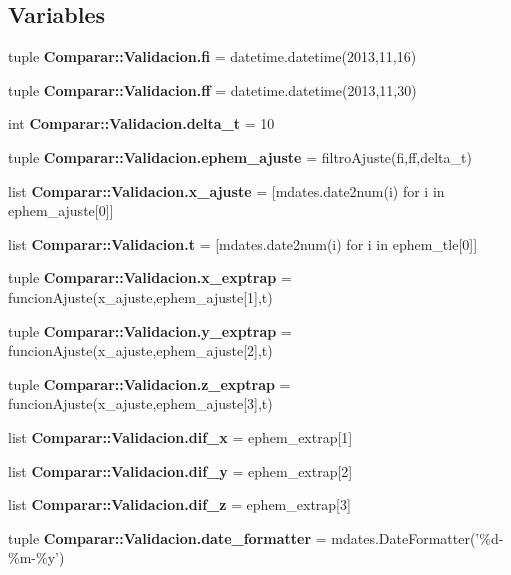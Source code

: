 \subsection*{\-Variables}
\begin{DoxyCompactItemize}
\item 
tuple {\bf \-Comparar\-::\-Validacion.\-fi} = datetime.\-datetime(2013,11,16)
\item 
tuple {\bf \-Comparar\-::\-Validacion.\-ff} = datetime.\-datetime(2013,11,30)
\item 
int {\bf \-Comparar\-::\-Validacion.\-delta\-\_\-t} = 10
\item 
tuple {\bf \-Comparar\-::\-Validacion.\-ephem\-\_\-ajuste} = filtro\-Ajuste(fi,ff,delta\-\_\-t)
\item 
list {\bf \-Comparar\-::\-Validacion.\-x\-\_\-ajuste} = [mdates.\-date2num(i) for i in ephem\-\_\-ajuste[0]]
\item 
list {\bf \-Comparar\-::\-Validacion.\-t} = [mdates.\-date2num(i) for i in ephem\-\_\-tle[0]]
\item 
tuple {\bf \-Comparar\-::\-Validacion.\-x\-\_\-exptrap} = funcion\-Ajuste(x\-\_\-ajuste,ephem\-\_\-ajuste[1],t)
\item 
tuple {\bf \-Comparar\-::\-Validacion.\-y\-\_\-exptrap} = funcion\-Ajuste(x\-\_\-ajuste,ephem\-\_\-ajuste[2],t)
\item 
tuple {\bf \-Comparar\-::\-Validacion.\-z\-\_\-exptrap} = funcion\-Ajuste(x\-\_\-ajuste,ephem\-\_\-ajuste[3],t)
\item 
list {\bf \-Comparar\-::\-Validacion.\-dif\-\_\-x} = ephem\-\_\-extrap[1]
\item 
list {\bf \-Comparar\-::\-Validacion.\-dif\-\_\-y} = ephem\-\_\-extrap[2]
\item 
list {\bf \-Comparar\-::\-Validacion.\-dif\-\_\-z} = ephem\-\_\-extrap[3]
\item 
tuple {\bf \-Comparar\-::\-Validacion.\-date\-\_\-formatter} = mdates.\-Date\-Formatter('\%d-\/\%m-\/\%y')
\end{DoxyCompactItemize}
